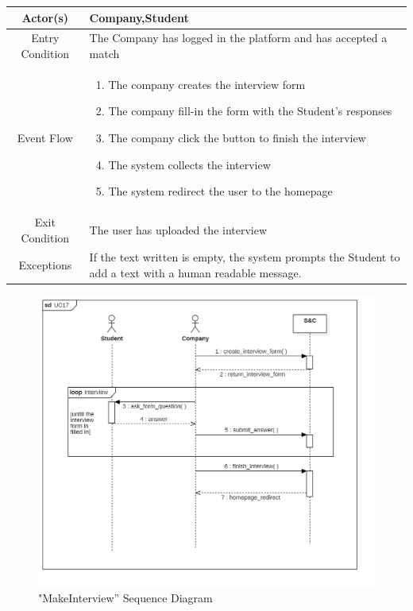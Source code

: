 \documentclass{article}
\begin{document}
\begin{table}[H]
    \centering
    \begin{tabular}{|c|p{10cm}|}
    \hline
        Actor(s)  & Company,Student\\ 
    \hline
        Entry Condition &  
        The Company has logged in the platform and has accepted a match\\
    \hline
        Event Flow &
        \begin{enumerate}
            \item The company creates the interview form 
            \item The company fill-in the form with the Student's responses
            \item The company click the button to finish the interview
            \item The system collects the interview 
            \item The system redirect the user to the homepage
        \end{enumerate}
        \\
    \hline
        Exit Condition & The user has uploaded the interview\\
    \hline
        Exceptions &  If the text written is empty, the system prompts the Student to add a text with a human readable message.\\
    \hline
    \end{tabular}
    \label{tab:my_label}
\end{table}
\begin{figure}[H]
    \centering
    \includegraphics[width=1\linewidth]{sequenceDiagrams/UC17.jpg}
    \caption{"MakeInterview” Sequence Diagram}
    \label{fig:enter-label}
\end{figure}
\end{document}
